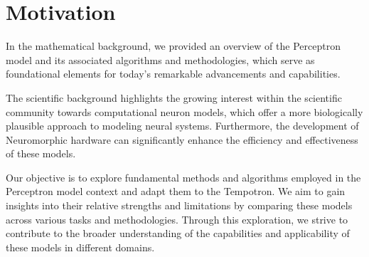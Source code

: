 \chapter{Motivation}
\label{chap:motivation}

In the mathematical background, we provided an overview of the Perceptron model and its associated algorithms and methodologies, which serve as foundational elements for today's remarkable advancements and capabilities. 

The scientific background highlights the growing interest within the scientific community towards computational neuron models, which offer a more biologically plausible approach to modeling neural systems. Furthermore, the development of Neuromorphic hardware can significantly enhance the efficiency and effectiveness of these models.

Our objective is to explore fundamental methods and algorithms employed in the Perceptron model context and adapt them to the Tempotron. We aim to gain insights into their relative strengths and limitations by comparing these models across various tasks and methodologies. Through this exploration, we strive to contribute to the broader understanding of the capabilities and applicability of these models in different domains.

